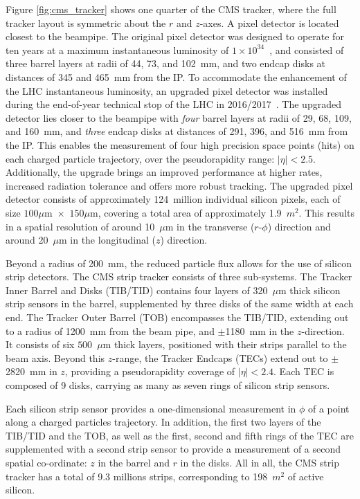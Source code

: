 Figure \ref{fig:cms_tracker} shows one quarter of the CMS tracker, where the full tracker layout is symmetric about the $r$ and $z$-axes. A pixel detector is located closest to the beampipe. The original pixel detector was designed to operate for ten years at a maximum instantaneous luminosity of $1\times10^{34}$~\lumi, and consisted of three barrel layers at radii of 44, 73, and 102~mm, and two endcap disks at distances of 345 and 465~mm from the IP. To accommodate the enhancement of the LHC instantaneous luminosity, an upgraded pixel detector was installed during the end-of-year technical stop of the LHC in 2016/2017~\cite{}. The upgraded detector lies closer to the beampipe with \textit{four} barrel layers at radii of 29, 68, 109, and 160~mm, and \textit{three} endcap disks at distances of 291, 396, and 516~mm from the IP. This enables the measurement of four high precision space points (hits) on each charged particle trajectory, over the pseudorapidity range: $|\eta|<2.5$. Additionally, the upgrade brings an improved performance at higher rates, increased radiation tolerance and offers more robust tracking. The upgraded pixel detector consists of approximately 124~million individual silicon pixels, each of size $100\mu$m~$\times$~$150\mu$m, covering a total area of approximately 1.9~$m^2$. This results in a spatial resolution of around 10~$\mu$m in the transverse ($r$-$\phi$) direction and around 20~$\mu$m in the longitudinal ($z$) direction.

Beyond a radius of 200~mm, the reduced particle flux allows for the use of silicon strip detectors. The CMS strip tracker consists of three sub-systems. The Tracker Inner Barrel and Disks (TIB/TID) contains four layers of $320$~$\mu$m thick silicon strip sensors in the barrel, supplemented by three disks of the same width at each end. The Tracker Outer Barrel (TOB) encompasses the TIB/TID, extending out to a radius of 1200~mm from the beam pipe, and $\pm$1180~mm in the $z$-direction. It consists of six $500$~$\mu$m thick layers, positioned with their strips parallel to the beam axis. Beyond this $z$-range, the Tracker Endcaps (TECs) extend out to $\pm$2820~mm in $z$, providing a pseudorapidity coverage of $|\eta|<2.4$. Each TEC is composed of 9 disks, carrying as many as seven rings of silicon strip sensors. 

Each silicon strip sensor provides a one-dimensional measurement in $\phi$ of a point along a charged particles trajectory. In addition, the first two layers of the TIB/TID and the TOB, as well as the first, second and fifth rings of the TEC are supplemented with a second strip sensor to provide a measurement of a second spatial co-ordinate: $z$ in the barrel and $r$ in the disks. All in all, the CMS strip tracker has a total of 9.3 millions strips, corresponding to 198~$m^2$ of active silicon.

